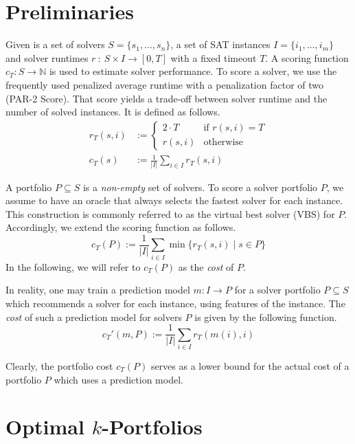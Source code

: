 \documentclass[conference]{IEEEtran}
\begin{document}
\section{Preliminaries}
\label{sec:preliminaries}

Given is a set of solvers $S = \{s_1, \dots, s_n\}$, a set of SAT instances $I = \{i_1, \dots, i_m\}$ and solver runtimes $r~:~S \times I \rightarrow [0, T]$ with a fixed timeout $T$.
A scoring function $c_T : S \rightarrow \mathbb{N}$ is used to estimate solver performance. 
To score a solver, we use the frequently used penalized average runtime with a penalization factor of two (PAR-2 Score). 
That score yields a trade-off between solver runtime and the number of solved instances.
It is defined as follows.%
\begin{align}
r_T(s,i) &:= \begin{cases}
	2 \cdot T & \text{if }r(s,i) = T\\
	r(s,i) & \text{otherwise}
\end{cases} \tag*{Penalized Runtimes}\\[.5em]
c_T(s) &:= \frac{1}{|I|} \sum_{i \in I}{r_T(s,i)} \tag*{PAR-2 Score}
\end{align}

A portfolio $P \subseteq S$ is a \emph{non-empty} set of solvers.
To score a solver portfolio $P$, we assume to have an oracle that always selects the fastest solver for each instance. 
This construction is commonly referred to as the virtual best solver (VBS) for $P$. 
Accordingly, we extend the scoring function as follows.%
$$
	c_{T}(P) := \frac{1}{|I|} \sum\limits_{i \in I}{\min\{r_T(s,i) \mid s \in P\}}
$$
In the following, we will refer to $c_{T}(P)$ as the \emph{cost} of $P$. 

In reality, one may train a prediction model $m : I \rightarrow P$ for a solver portfolio $P \subseteq S$ which recommends a solver for each instance, using features of the instance. 
The \emph{cost} of such a prediction model for solvers $P$ is given by the following function.%
$$
	c_{T}'(m,P) := \frac{1}{|I|} \sum\limits_{i \in I}{r_T(m(i),i)}
$$

Clearly, the portfolio cost $c_{T}(P)$ serves as a lower bound for the actual cost of a portfolio $P$ which uses a prediction model.

\section{Optimal \texorpdfstring{$k$}{k}-Portfolios} %
\label{sec:approach}
\end{document}

